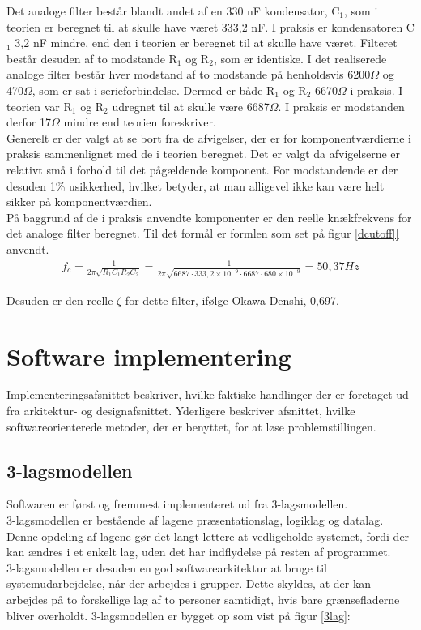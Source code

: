 Det analoge filter består blandt andet af en 330 nF kondensator, C$_1$, som i teorien er beregnet til at skulle have været 333,2 nF. I praksis er kondensatoren C$_1$ 3,2 nF mindre, end den i teorien er beregnet til at skulle have været. Filteret består desuden af to modstande R$_1$ og R$_2$, som er identiske. I det realiserede analoge filter består hver modstand af to modstande på henholdsvis 6200$\Omega$ og 470$\Omega$, som er sat i serieforbindelse. Dermed er både R$_1$ og R$_2$ 6670$\Omega$ i praksis. I teorien var R$_1$ og R$_2$ udregnet til at skulle være 6687$\Omega$. I praksis er modstanden derfor 17$\Omega$ mindre end teorien foreskriver.\\

Generelt er der valgt at se bort fra de afvigelser, der er for komponentværdierne i praksis sammenlignet med de i teorien beregnet. Det er valgt da afvigelserne er relativt små i forhold til det pågældende komponent. For modstandende er der desuden 1\% usikkerhed, hvilket betyder, at man alligevel ikke kan være helt sikker på komponentværdien.\\

På baggrund af de i praksis anvendte komponenter er den reelle knækfrekvens for det analoge filter beregnet. Til det formål er formlen som set på figur \ref{dcutoff]} anvendt.\\

\begin{align}
f_{c} = \frac{1}{2\pi \sqrt{R_{1}C_{1}R_{2}C_{2}}} = \frac{1}{2\pi \sqrt{6687 \cdot 333,2\times 10^{-9} \cdot 6687 \cdot 680\times 10^{-9}}} = 50,37 Hz
	\label{dcutoff}
\end{align}

Desuden er den reelle $\zeta$ for dette filter, ifølge Okawa-Denshi, 0,697.


\section{Software implementering}\label{implementering}
Implementeringsafsnittet beskriver, hvilke faktiske handlinger der er foretaget ud fra arkitektur- og designafsnittet. Yderligere beskriver afsnittet, hvilke softwareorienterede metoder, der er benyttet, for at løse problemstillingen.

\subsection{3-lagsmodellen}
Softwaren er først og fremmest implementeret ud fra 3-lagsmodellen.\\
3-lagsmodellen er bestående af lagene præsentationslag, logiklag og datalag.
Denne opdeling af lagene gør det langt lettere at vedligeholde systemet, fordi der kan ændres i et enkelt lag, uden det har indflydelse på resten af programmet. \\
3-lagsmodellen er desuden en god softwarearkitektur at bruge til  systemudarbejdelse, når der arbejdes i grupper. Dette skyldes, at der kan arbejdes på to forskellige lag af to personer samtidigt, hvis bare grænsefladerne bliver overholdt. 3-lagsmodellen er bygget op som vist på figur \ref{3lag}:

